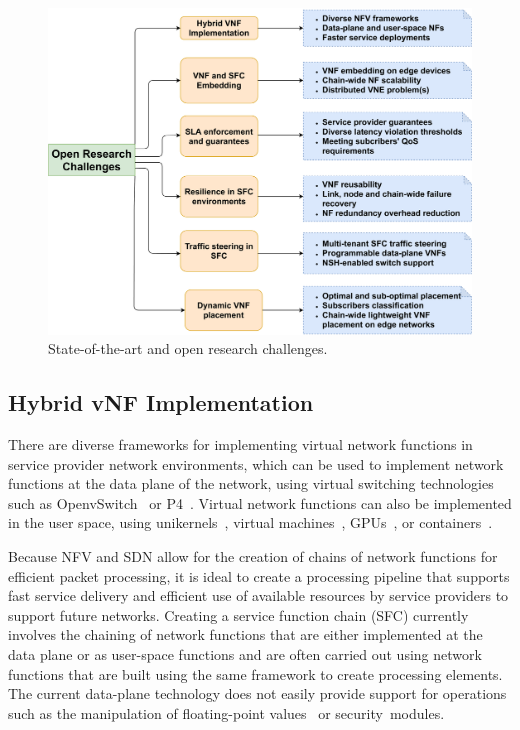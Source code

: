 \documentclass[futureinternet,review,accept,pdftex,moreauthors]{Definitions/mdpi}
\begin{document}
\begin{figure}[H]%
\includegraphics[width=0.9\columnwidth]{OpenChallenges.pdf}
\caption{State-of-the-art and open research challenges.}
\label{OpenChallenges-pic}
\end{figure}




\subsection{Hybrid vNF Implementation}
\label{Hybrid}
There are diverse frameworks for implementing virtual network functions in service provider network environments,  which can be used to implement network functions at the data plane of the network, using virtual switching technologies such as OpenvSwitch~\cite{jackson2016softflow} or P4~\cite{bosshart2014p4}. Virtual network functions can also be implemented in the user space, using unikernels~\cite{kurek2019unikernel}, virtual machines~\cite{laghrissi2017towards}, GPUs~\cite{yi2017gpunfv}, or containers~\cite{zhang2016opennetvm}. 

Because NFV and SDN allow for the creation of chains of network functions for efficient packet processing, it is ideal to create a processing pipeline that supports fast service delivery and efficient use of available resources by service providers to support future networks. Creating a service function chain (SFC) currently involves the chaining of network functions that are either implemented at the data plane or as user-space functions and are often carried out using network functions that are built using the same framework to create processing elements. The current data-plane technology does not easily provide support for operations such as the manipulation of floating-point values~\cite{simpson2020seidhr} or security~modules. 
\end{document}
